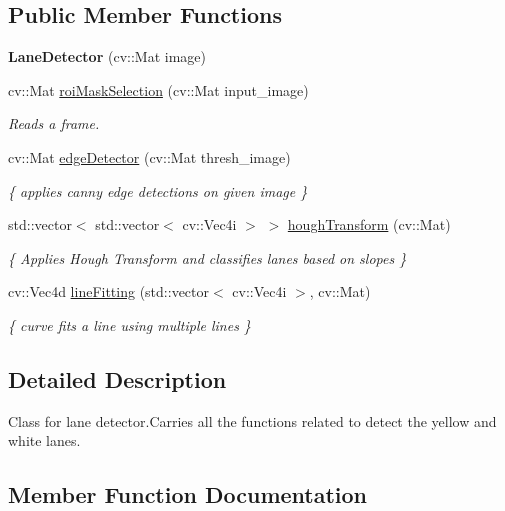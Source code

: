 \subsection*{Public Member Functions}
\begin{DoxyCompactItemize}
\item 
{\bfseries Lane\+Detector} (cv\+::\+Mat image)\hypertarget{classLaneDetector_acc1aae3bfdd21112a448956fb94d95a7}{}\label{classLaneDetector_acc1aae3bfdd21112a448956fb94d95a7}

\item 
cv\+::\+Mat \hyperlink{classLaneDetector_a5ad301b4756ae451f49b43947771c02f}{roi\+Mask\+Selection} (cv\+::\+Mat input\+\_\+image)
\begin{DoxyCompactList}\small\item\em Reads a frame. \end{DoxyCompactList}\item 
cv\+::\+Mat \hyperlink{classLaneDetector_a2caab27786b6168a125313aa2c36434b}{edge\+Detector} (cv\+::\+Mat thresh\+\_\+image)
\begin{DoxyCompactList}\small\item\em \{ applies canny edge detections on given image \} \end{DoxyCompactList}\item 
std\+::vector$<$ std\+::vector$<$ cv\+::\+Vec4i $>$ $>$ \hyperlink{classLaneDetector_a88ab13cba16e8e817b6d913d5acd681b}{hough\+Transform} (cv\+::\+Mat)
\begin{DoxyCompactList}\small\item\em \{ Applies Hough Transform and classifies lanes based on slopes \} \end{DoxyCompactList}\item 
cv\+::\+Vec4d \hyperlink{classLaneDetector_a8cb3e5505c760fa460a01f8eacbb3f1c}{line\+Fitting} (std\+::vector$<$ cv\+::\+Vec4i $>$, cv\+::\+Mat)
\begin{DoxyCompactList}\small\item\em \{ curve fits a line using multiple lines \} \end{DoxyCompactList}\end{DoxyCompactItemize}


\subsection{Detailed Description}
Class for lane detector.\+Carries all the functions related to detect the yellow and white lanes. 

\subsection{Member Function Documentation}
